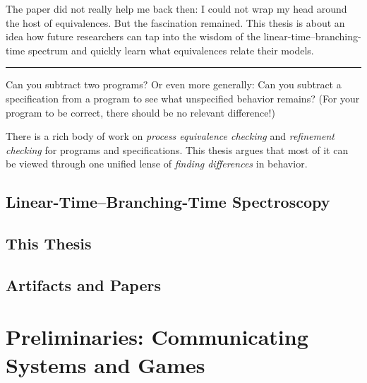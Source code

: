 \documentclass[
  a4paper,
]{report}
\theoremstyle{plain}
\theoremstyle{plain}
\theoremstyle{definition}
\theoremstyle{plain}
\theoremstyle{definition}
\theoremstyle{remark}
\begin{document}
The paper did not really help me back then: I could not wrap my head
around the host of equivalences. But the fascination remained. This
thesis is about an idea how future researchers can tap into the wisdom
of the linear-time--branching-time spectrum and quickly learn what
equivalences relate their models.

\begin{center}\rule{0.5\linewidth}{0.5pt}\end{center}

Can you subtract two programs? Or even more generally: Can you subtract
a specification from a program to see what unspecified behavior remains?
(For your program to be correct, there should be no relevant
difference!)

There is a rich body of work on \emph{process equivalence checking} and
\emph{refinement checking} for programs and specifications. This thesis
argues that most of it can be viewed through one unified lense of
\emph{finding differences} in behavior.

\section{Linear-Time--Branching-Time
Spectroscopy}\label{linear-timebranching-time-spectroscopy}

\section{This Thesis}\label{this-thesis}

\section{Artifacts and Papers}\label{artifacts-and-papers}


\chapter{Preliminaries: Communicating Systems and
Games}\label{preliminaries-communicating-systems-and-games}

\providecommand{\lc}[1]{}

\providecommand{\inverse}[1]{#1^{-1}}
\providecommand{\setminus}{\mathbin{\backslash}}
\providecommand{\powerset}[1]{2^{#1}}
\providecommand{\defiff}{\mathrel{:\!\iff}}
\providecommand{\set}[1]{\{#1\}}
\providecommand{\emptyword}{\texttt{()}}
\providecommand{\identity}[1]{\mathrm{id}_{#1}}
\end{document}
